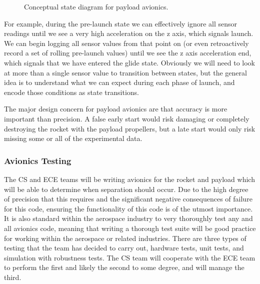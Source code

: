 \documentclass[onecolumn, draftclsnofoot, 10pt, compsoc]{IEEEtran}
\begin{document}
\begin{figure}[!ht]
  \centering
  \caption{Conceptual state diagram for payload avionics.}
\end{figure}

For example, during the pre-launch state we can effectively ignore all sensor readings until we see a very high acceleration on the z axis, which signals launch.  We can begin logging all sensor values from that point on (or even retroactively record a set of rolling pre-launch values) until we see the z axis acceleration end, which signals that we have entered the glide state.  Obviously we will need to look at more than a single sensor value to transition between states, but the general idea is to understand what we can expect during each phase of launch, and encode those conditions as state transitions.

The major design concern for payload avionics are that accuracy is more important than precision.  A false early start would risk damaging or completely destroying the rocket with the payload propellers, but a late start would only risk missing some or all of the experimental data.

\subsubsection{Avionics Testing}
The CS and ECE teams will be writing avionics for the rocket and payload which will be able to determine when separation should occur. Due to the high degree of precision that this requires and the significant negative consequences of failure for this code, ensuring the functionality of this code is of the utmost importance. It is also standard within the aerospace industry to very thoroughly test any and all avionics code, meaning that writing a thorough test suite will be good practice for working within the aerospace or related industries. There are three types of testing that the team has decided to carry out, hardware tests, unit tests, and simulation with robustness tests. The CS team will cooperate with the ECE team to perform the first and likely the second to some degree, and will manage the third.
\end{document}
